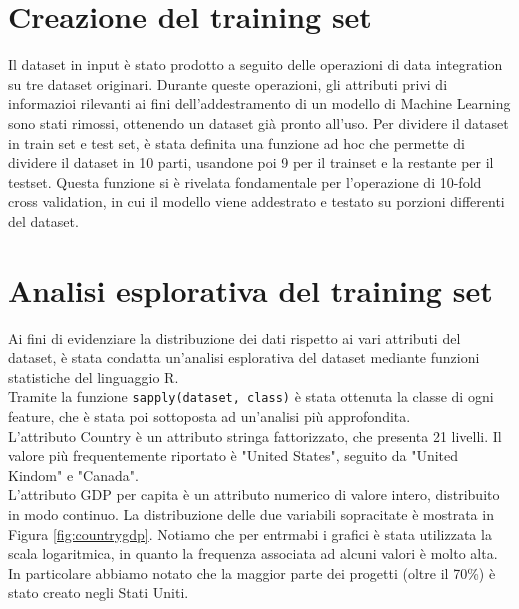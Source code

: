 \section{Creazione del training set}
Il dataset in input è stato prodotto a seguito delle operazioni di data integration su tre dataset originari. Durante queste operazioni, gli attributi privi di informazioi rilevanti ai fini dell'addestramento di un modello di Machine Learning sono stati rimossi, ottenendo un dataset già pronto all'uso. Per dividere il dataset in train set e test set, è stata definita una funzione ad hoc che permette di dividere il dataset in 10 parti, usandone poi 9 per il trainset e la restante per il testset. Questa funzione si è rivelata fondamentale per l'operazione di 10-fold cross validation, in cui il modello viene addestrato e testato su porzioni differenti del dataset.

\section{Analisi esplorativa del training set}
Ai fini di evidenziare la distribuzione dei dati rispetto ai vari attributi del dataset, è stata condatta un'analisi esplorativa del dataset mediante funzioni statistiche del linguaggio R.\\
Tramite la funzione \texttt{sapply(dataset, class)} è stata ottenuta la classe di ogni feature, che è stata poi sottoposta ad un'analisi più approfondita.\\
L'attributo Country è un attributo stringa fattorizzato, che presenta 21 livelli. Il valore più frequentemente riportato è "United States", seguito da "United Kindom" e "Canada".\\
L'attributo GDP per capita è un attributo numerico di valore intero, distribuito in modo continuo. La distribuzione delle due variabili sopracitate è mostrata in Figura \ref{fig:countrygdp}. Notiamo che per entrmabi i grafici è stata utilizzata la scala logaritmica, in quanto la frequenza associata ad alcuni valori è molto alta. In particolare abbiamo notato che la maggior parte dei progetti (oltre il 70\%) è stato creato negli Stati Uniti.

